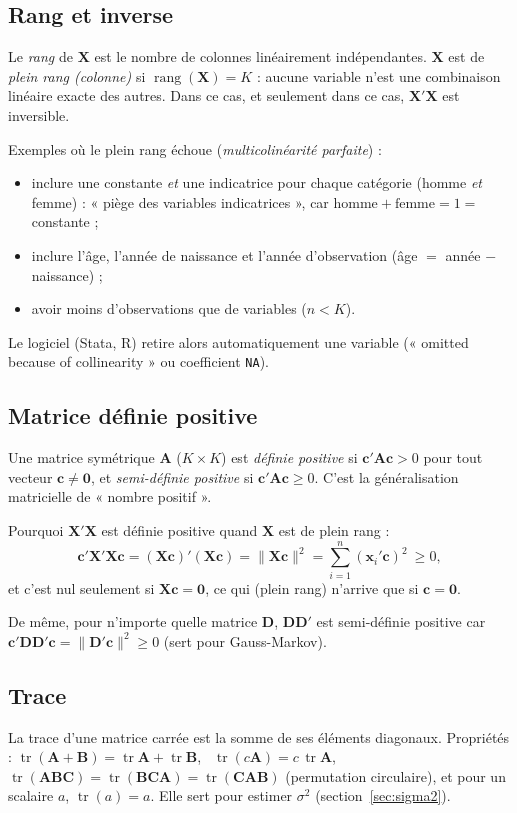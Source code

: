 \documentclass[11pt,a4paper]{article}
\newcommand{\vX}{\mathbf{X}}
\newcommand{\vx}{\mathbf{x}}
\newcommand{\C}{\mathbf{C}}
\newcommand{\D}{\mathbf{D}}
\newcommand{\A}{\mathbf{A}}
\newcommand{\XtX}{\vX'\vX}
\newcommand{\tr}{\operatorname{tr}}
\newcommand{\rg}{\operatorname{rang}}
\newcommand{\sumi}{\sum_{i=1}^{n}}
\begin{document}
\subsection{Rang et inverse}
Le \emph{rang} de $\vX$ est le nombre de colonnes linéairement indépendantes. $\vX$ est de \emph{plein rang (colonne)} si $\rg(\vX)=K$ : aucune variable n'est une combinaison linéaire exacte des autres. Dans ce cas, et seulement dans ce cas, $\XtX$ est inversible.

\begin{attention}
Exemples où le plein rang échoue (\emph{multicolinéarité parfaite}) :
\begin{itemize}[nosep]
\item inclure une constante \emph{et} une indicatrice pour chaque catégorie (homme \emph{et} femme) : « piège des variables indicatrices », car $\text{homme}+\text{femme}=1=$ constante ;
\item inclure l'âge, l'année de naissance et l'année d'observation (âge $=$ année $-$ naissance) ;
\item avoir moins d'observations que de variables ($n<K$).
\end{itemize}
Le logiciel (Stata, R) retire alors automatiquement une variable (« omitted because of collinearity » ou coefficient \texttt{NA}).
\end{attention}

\subsection{Matrice définie positive}
Une matrice symétrique $\A$ ($K\times K$) est \emph{définie positive} si $\mathbf{c}'\A\mathbf{c}>0$ pour tout vecteur $\mathbf{c}\neq \mathbf 0$, et \emph{semi-définie positive} si $\mathbf{c}'\A\mathbf{c}\ge 0$. C'est la généralisation matricielle de « nombre positif ».

Pourquoi $\XtX$ est définie positive quand $\vX$ est de plein rang :
\[
\mathbf{c}'\XtX\mathbf{c}=(\vX\mathbf{c})'(\vX\mathbf{c})=\|\vX\mathbf{c}\|^2=\sumi (\vx_i'\mathbf{c})^2\ \ge 0,
\]
et c'est nul seulement si $\vX\mathbf{c}=\mathbf 0$, ce qui (plein rang) n'arrive que si $\mathbf{c}=\mathbf 0$.

De même, pour n'importe quelle matrice $\D$, $\D\D'$ est semi-définie positive car $\mathbf{c}'\D\D'\mathbf{c}=\|\D'\mathbf{c}\|^2\ge0$ (sert pour Gauss-Markov).

\subsection{Trace}
La trace d'une matrice carrée est la somme de ses éléments diagonaux. Propriétés :
$\tr(\A+\mathbf{B})=\tr\A+\tr\mathbf{B}$, \ $\tr(c\A)=c\,\tr\A$, \ $\tr(\A\mathbf{B}\C)=\tr(\mathbf{B}\C\A)=\tr(\C\A\mathbf{B})$ (permutation circulaire), et pour un scalaire $a$, $\tr(a)=a$.
Elle sert pour estimer $\sigma^2$ (section~\ref{sec:sigma2}).
\end{document}
